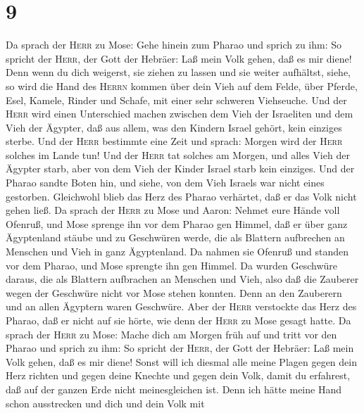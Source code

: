 \hypertarget{section-8}{%
\section{9}\label{section-8}}

 Da sprach der \textsc{Herr} zu Mose: Gehe hinein zum
Pharao und sprich zu ihm: So spricht der \textsc{Herr}, der Gott der
Hebräer: Laß mein Volk gehen, daß es mir diene!  Denn wenn
du dich weigerst, sie ziehen zu lassen und sie weiter aufhältst,
 siehe, so wird die Hand des \textsc{Herrn} kommen über
dein Vieh auf dem Felde, über Pferde, Esel, Kamele, Rinder und Schafe,
mit einer sehr schweren Viehseuche.  Und der \textsc{Herr}
wird einen Unterschied machen zwischen dem Vieh der Israeliten und dem
Vieh der Ägypter, daß aus allem, was den Kindern Israel gehört, kein
einziges sterbe.  Und der \textsc{Herr} bestimmte eine
Zeit und sprach: Morgen wird der \textsc{Herr} solches im Lande tun!
 Und der \textsc{Herr} tat solches am Morgen, und alles
Vieh der Ägypter starb, aber von dem Vieh der Kinder Israel starb kein
einziges.  Und der Pharao sandte Boten hin, und siehe, von
dem Vieh Israels war nicht eines gestorben. Gleichwohl blieb das Herz
des Pharao verhärtet, daß er das Volk nicht gehen ließ. 
Da sprach der \textsc{Herr} zu Mose und Aaron: Nehmet eure Hände voll
Ofenruß, und Mose sprenge ihn vor dem Pharao gen Himmel, 
daß er über ganz Ägyptenland stäube und zu Geschwüren werde, die als
Blattern aufbrechen an Menschen und Vieh in ganz Ägyptenland.
 Da nahmen sie Ofenruß und standen vor dem Pharao, und
Mose sprengte ihn gen Himmel. Da wurden Geschwüre daraus, die als
Blattern aufbrachen an Menschen und Vieh,  also daß die
Zauberer wegen der Geschwüre nicht vor Mose stehen konnten. Denn an den
Zauberern und an allen Ägyptern waren Geschwüre.  Aber
der \textsc{Herr} verstockte das Herz des Pharao, daß er nicht auf sie
hörte, wie denn der \textsc{Herr} zu Mose gesagt hatte. 
Da sprach der \textsc{Herr} zu Mose: Mache dich am Morgen früh auf und
tritt vor den Pharao und sprich zu ihm: So spricht der \textsc{Herr},
der Gott der Hebräer: Laß mein Volk gehen, daß es mir diene!
 Sonst will ich diesmal alle meine Plagen gegen dein Herz
richten und gegen deine Knechte und gegen dein Volk, damit du erfahrest,
daß auf der ganzen Erde nicht meinesgleichen ist.  Denn
ich hätte meine Hand schon ausstrecken und dich und dein Volk mit
